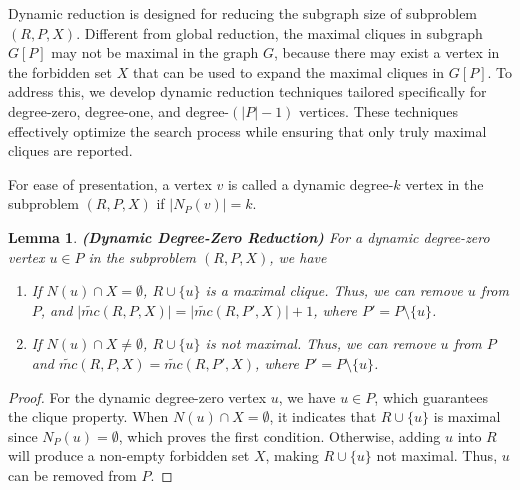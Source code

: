 \documentclass[sigconf, nonacm]{acmart}
\newtheorem{lem}[thm]{\bf Lemma}
\begin{document}
{Dynamic reduction is designed for reducing the subgraph size of subproblem $(R,P,X)$. Different from global reduction, the maximal cliques in subgraph $G[P]$ may not be maximal in the graph $G$, because there may exist a vertex in the forbidden set $X$ that can be used to expand the maximal cliques in $G[P]$. 
To address this, we develop dynamic reduction techniques tailored specifically for degree-zero, degree-one, and degree-$(\lvert P\rvert-1)$ vertices. These techniques effectively optimize the search process while ensuring that only truly maximal cliques are reported.

For ease of presentation, a vertex $v$ is called a dynamic degree-$k$ vertex in the subproblem $(R,P,X)$ if $\lvert N_P(v)\rvert = k$.
\begin{lem}{\textbf{(Dynamic Degree-Zero Reduction)}} 
For a dynamic degree-zero vertex $u\in P$ %
in the subproblem $(R,P,X)$, we have 
\begin{enumerate} 
    \item If $N(u) \cap X = \emptyset$, $R \cup \{u\}$ is a maximal clique. Thus, we can remove $u$ from $P$, and $\lvert\tilde{mc}(R,P,X)\rvert=\lvert\tilde{mc}(R,P',X)\rvert+1$, where $P'=P\setminus \{u\}$. 
    \item If $N(u) \cap X \neq \emptyset$, $R \cup \{u\}$ is not maximal. Thus, we can remove $u$ from $P$ and $\tilde{mc}(R,P,X)=\tilde{mc}(R,P',X)$, where $P'=P\setminus \{u\}$. 
\end{enumerate}

\label{lemma4}
\end{lem}
\begin{proof}
   For the dynamic degree-zero vertex $u$, 
    we have $u \in P$, which guarantees the clique property. When $N(u) \cap X = \emptyset$, it indicates that $R\cup \{u\}$ is maximal since $N_P(u)=\emptyset$, which proves the first condition. Otherwise, adding $u$ into $R$ will produce a non-empty forbidden set $X$, making $R\cup\{u\}$ not maximal. Thus, $u$ can be removed from %
    $P$.
\end{proof}



}
\end{document}
